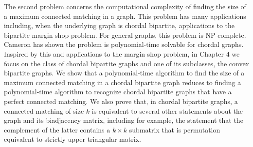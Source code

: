 The second problem concerns the computational complexity of finding the size of a
maximum connected matching in a graph.  This problem has many applications including, when
the underlying graph is chordal bipartite, applications to
the bipartite margin shop problem.  For general graphs, this problem is NP-complete.
Cameron has shown the problem is polynomial-time solvable for chordal graphs. Inspired by this and applications to the margin shop problem,
in Chapter 4 we 
focus on the class of chordal bipartite graphs and one of its subclasses, the convex bipartite graphs.   
We show that a polynomial-time algorithm to find the size of a
maximum connected matching in a chordal bipartite graph reduces to finding a polynomial-time
algorithm to recognize chordal bipartite graphs that have a perfect connected matching.  We
also prove that, in chordal bipartite graphs, a connected matching of size $k$ is equivalent
to several other statements about the graph and its biadjacency matrix, including for example,
the statement that the complement of the latter contains a $k \times k$ submatrix that is 
permutation equivalent to strictly upper triangular matrix.   \pagebreak